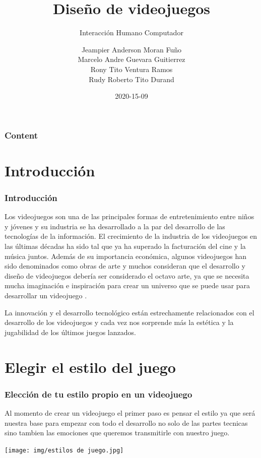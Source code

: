 \documentclass[11pt]{beamer}
\title[Introducción]{\bf\Huge Diseño de videojuegos}
\subtitle{Interacción Humano Computador}
\author[rescobedoq]
{
	Jeampier Anderson Moran Fuño \inst{1}\\
	Marcelo Andre Guevara Guitierrez\inst{1}\\
	Rony Tito Ventura Ramos\inst{1}\\
	Rudy Roberto Tito Durand\inst{1}
}
\institute[UNSA]
{
\inst{1}%
System Engineering School\\
System Engineering and Informatic Department\\
Production and Services Faculty\\
San Agustin National University of Arequipa
}
\date[2020-15-09]{\scriptsize{2020-15-09}}
\begin{document}
\begin{frame}
\titlepage
\end{frame}

\begin{frame}
\frametitle{Content}
\tableofcontents
\end{frame}

\section{Introducción}
\begin{frame}
\frametitle{Introducción}
Los videojuegos son una de las principales formas de entretenimiento entre niños y jóvenes y su industria se ha desarrollado a la par del desarrollo de las tecnologías de la información. El crecimiento de la industria de los videojuegos en las últimas décadas ha sido tal que ya ha superado la facturación del cine y la música juntos. Además de su importancia económica, algunos videojuegos han sido denominados como obras de arte y muchos consideran que el desarrollo y diseño de videojuegos debería ser considerado el octavo arte, ya que se necesita mucha imaginación e inspiración para crear un universo que se puede usar para desarrollar un videojuego .

La innovación y el desarrollo tecnológico están estrechamente relacionados con el desarrollo de los videojuegos y cada vez nos sorprende más la estética y la jugabilidad de los últimos juegos lanzados.

\end{frame}

\section{Elegir el estilo del juego}
\begin{frame}
\frametitle{Elección de tu estilo propio en un videojuego}
Al momento de crear un videojuego el primer paso es pensar el estilo ya que será nuestra base para empezar con todo el desarrollo no solo de las partes tecnicas sino tambien las emociones que queremos transmitirle con nuestro juego.
\begin{center}
 \texttt{[image: img/estilos de juego.jpg]}
\end{center}
\end{frame}
\end{document}
